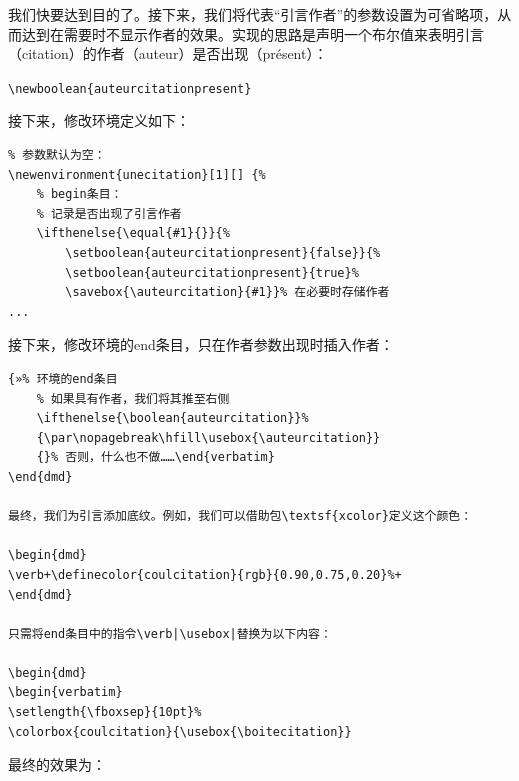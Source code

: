 我们快要达到目的了。接下来，我们将代表“引言作者”的参数设置为可省略项，从而达到在需要时不显示作者的效果。实现的思路是声明一个布尔值来表明引言（citation）的作者（auteur）是否出现（présent）：

\begin{dmd}
\verb|\newboolean{auteurcitationpresent}|
\end{dmd}

接下来，修改环境定义如下：

\begin{dmd}
\begin{verbatim}
% 参数默认为空：
\newenvironment{unecitation}[1][] {%
    % begin条目：
    % 记录是否出现了引言作者
    \ifthenelse{\equal{#1}{}}{%
        \setboolean{auteurcitationpresent}{false}}{% 
        \setboolean{auteurcitationpresent}{true}% 
        \savebox{\auteurcitation}{#1}}% 在必要时存储作者
...\end{verbatim}
\end{dmd}

接下来，修改环境的end条目，只在作者参数出现时插入作者：

\begin{dmd}
\begin{verbatim}
{»% 环境的end条目
    % 如果具有作者，我们将其推至右侧
    \ifthenelse{\boolean{auteurcitation}}% 
    {\par\nopagebreak\hfill\usebox{\auteurcitation}} 
    {}% 否则，什么也不做……\end{verbatim}
\end{dmd}

最终，我们为引言添加底纹。例如，我们可以借助包\textsf{xcolor}定义这个颜色：

\begin{dmd}
\verb+\definecolor{coulcitation}{rgb}{0.90,0.75,0.20}%+
\end{dmd}

只需将end条目中的指令\verb|\usebox|替换为以下内容：

\begin{dmd}
\begin{verbatim}
\setlength{\fboxsep}{10pt}% 
\colorbox{coulcitation}{\usebox{\boitecitation}}\end{verbatim}
\end{dmd}

最终的效果为：


